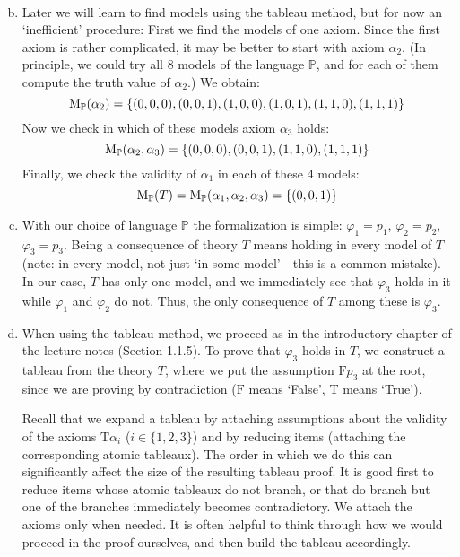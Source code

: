 \begin{problem}
\begin{solution}
\begin{enumerate}[(a)]
\begin{align*}
            \end{align*}
            \item Later we will learn to find models using the tableau method, but for now an `inefficient' procedure: First we find the models of one axiom. Since the first axiom is rather complicated, it may be better to start with axiom $\alpha_2$. (In principle, we could try all 8 models of the language $\mathbb P$, and for each of them compute the truth value of $\alpha_2$.) We obtain:
            $$
            \operatorname{M}_\mathbb P(\alpha_2)=\{(0,0,0),(0,0,1),(1,0,0),(1,0,1),(1,1,0),(1,1,1)\}
            $$
            Now we check in which of these models axiom $\alpha_3$ holds:
            $$
            \operatorname{M}_\mathbb P(\alpha_2,\alpha_3)=\{(0,0,0),(0,0,1),(1,1,0),(1,1,1)\}
            $$
            Finally, we check the validity of $\alpha_1$ in each of these 4 models:
            $$
            \operatorname{M}_\mathbb P(T)=\operatorname{M}_\mathbb P(\alpha_1,\alpha_2,\alpha_3)=\{(0,0,1)\}
            $$
            \item With our choice of language $\mathbb P$ the formalization is simple: $\varphi_1=p_1$, $\varphi_2=p_2$, $\varphi_3=p_3$. Being a consequence of theory $T$ means holding in every model of $T$ (note: in every model, not just `in some model’---this is a common mistake). In our case, $T$ has only one model, and we immediately see that $\varphi_3$ holds in it while $\varphi_1$ and $\varphi_2$ do not. Thus, the only consequence of $T$ among these is $\varphi_3$.
            \item When using the tableau method, we proceed as in the introductory chapter of the lecture notes (Section 1.1.5). To prove that $\varphi_3$ holds in $T$, we construct a tableau from the theory $T$, where we put the assumption $\mathrm{F}p_3$ at the root, since we are proving by contradiction ($\mathrm{F}$ means `False’, $\mathrm{T}$ means `True’). 
            
            Recall that we expand a tableau by attaching assumptions about the validity of the axioms $\mathrm{T}\alpha_i$ ($i\in\{1,2,3\}$) and by reducing items (attaching the corresponding atomic tableaux). The order in which we do this can significantly affect the size of the resulting tableau proof. It is good first to reduce items whose atomic tableaux do not branch, or that do branch but one of the branches immediately becomes contradictory. We attach the axioms only when needed. It is often helpful to think through how we would proceed in the proof ourselves, and then build the tableau accordingly.


\end{enumerate}
\end{solution}
\end{problem}
